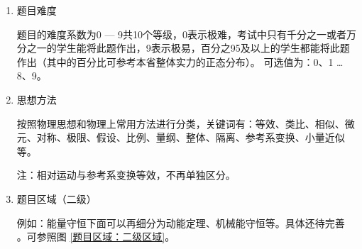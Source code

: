 \documentclass{ctexbook}
\begin{document}
\begin{enumerate}
	\renewcommand{\labelenumi}{\arabic{enumi}.}
\item 
题目难度

题目的难度系数为0 --- 9共10个等级，0表示极难，考试中只有千分之一或者万分之一的学生能将此题作出，9表示极易，百分之95及以上的学生都能将此题作出（其中的百分比可参考本省整体实力的正态分布）。
可选值为：0、1 …  8、9。

	\item
	思想方法
	
	按照物理思想和物理上常用方法进行分类，关键词有：等效、类比、相似、微元、对称、极限、假设、比例、量纲、整体、隔离、参考系变换、小量近似等。
	
	注：相对运动与参考系变换等效，不再单独区分。
	\item 
	题目区域（二级）
	
	例如：能量守恒下面可以再细分为动能定理、机械能守恒等。具体还待完善 。可参照图 \ref{题目区域：二级区域}。


\end{enumerate}
\end{document}
